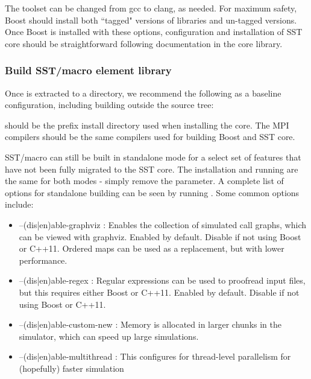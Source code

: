 The toolset can be changed from gcc to clang, as needed.  For maximum safety, Boost should install both ``tagged" versions of libraries and un-tagged versions.  Once Boost is installed with these options, configuration and installation of SST core should be straightforward following documentation in the core library.

\subsubsection{Build SST/macro element library}\label{subsec:buildElementLib}
Once \sstmacro is extracted to a directory, we recommend the following as a baseline configuration, including building outside the source tree:

 should be the prefix install directory used when installing the core.  The MPI compilers should be the same compilers used for building Boost and SST core.

SST/macro can still be built in standalone mode for a select set of features that have not been fully migrated to the SST core.  The installation and running are the same for both modes - simply remove the  parameter.  A complete list of options for standalone building can be seen by running .   Some common options include:

\begin{itemize}
\item --(dis|en)able-graphviz : Enables the collection of simulated call graphs, which can be viewed with graphviz.
Enabled by default. Disable if not using Boost or C++11. Ordered maps can be used as a replacement, but with lower performance.
\item --(dis|en)able-regex : Regular expressions can be used to proofread input files, but this requires either Boost or C++11.
Enabled by default. Disable if not using Boost or C++11.
\item --(dis|en)able-custom-new : Memory is allocated in larger chunks in the simulator, which can speed up large simulations.
\item --(dis|en)able-multithread : This configures for thread-level parallelism for (hopefully) faster simulation
\end{itemize}

